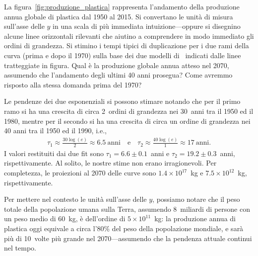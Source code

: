 \begin{exercise}

La figura~\ref{fig:produzione_plastica} rappresenta l'andamento della produzione annua
globale di plastica dal 1950 al 2015. Si convertano le unità di misura sull'asse
delle $y$ in una scala di più immediata intuizione---oppure si disegnino alcune
linee orizzontali rilevanti che aiutino a comprendere in modo immediato gli
ordini di grandezza. Si stimino i tempi tipici di duplicazione per i due rami della
curva (prima e dopo il 1970) sulla base dei due modelli di \bestfit\ indicati dalle
linee tratteggiate in figura. Qual è la produzione globale annua atteso nel 2070,
assumendo che l'andamento degli ultimi 40 anni prosegua? Come avremmo risposto
alla stessa domanda prima del 1970?


\end{exercise}


\begin{solution}

Le pendenze dei due esponenziali si possono stimare notando che per il primo
ramo si ha una crescita di circa 2~ordini di grandezza nei 30~anni tra il 1950
ed il 1980, mentre per il secondo si ha una crescita di circa un ordine di grandezza
nei 40 anni tra il 1950 ed il 1990, i.e.,
\begin{align*}
  \tau_1 \approx \frac{30 \log(e)}{2} \approx 6.5~\text{anni} \quad \text{e} \quad
  \tau_2 \approx \frac{40 \log(e)}{1} \approx 17~\text{anni}.
\end{align*}
I valori restituiti dai due fit sono $\tau_1 = 6.6 \pm 0.1$~anni e
$\tau_2 = 19.2 \pm 0.3$~anni, rispettivamente. Al solito, le nostre stime non
erano irragionevoli. Per completezza, le proiezioni al 2070 delle curve sono
$1.4 \times 10^{17}$~kg e $7.5 \times 10^{12}$~kg, rispettivamente.

Per mettere nel contesto le unità sull'asse delle $y$, possiamo notare che
il peso totale della popolazione umana sulla Terra, assumendo 8~miliardi di
persone con un peso medio di $60$~kg, è dell'ordine di $5 \times 10^{11}$~kg:
la produzione annua di plastica oggi equivale a circa l'80\% del peso della
popolazione mondiale, e sarà più di 10~volte più grande nel 2070---assumendo
che la pendenza attuale continui nel tempo.

\end{solution}
